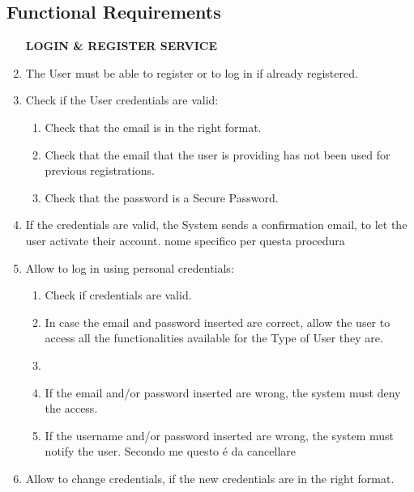\documentclass[a4paper, 10pt, oneside]{article}
\newcommand*{\lorenzo}[1]{\textcolor{BurntOrange}{#1}}
\begin{document}
\subsection{Functional Requirements}
\begin{enumerate}[align=left]
    \item[\textbf{LOGIN \& REGISTER SERVICE}]
    \item \label{req:logOrReg} The User must be able to register or to log in if already registered.
    \item \label{req:credentialsCheck} Check if the User credentials are valid:
    \begin{enumerate}[label={-}]
        \item \label{req:credentialsCheck:email} Check that the email is in the right format.
        \item \label{req:credentialsCheck:uniqueness} Check that the email that the user is providing has not been used for previous registrations.
        \item \label{req:credentialsCheck:password}Check that the password is a Secure Password.
    \end{enumerate}
    \item \label{req:confirmRegistration}If the credentials are valid, the System sends a confirmation email, to let the user activate their account. \lorenzo{nome specifico per questa procedura}
    \item \label{req:login} Allow to log in using personal credentials:
    \begin{enumerate}[label={-}]
        \item \label{req:login:checkCred}Check if credentials are valid.
        \item \label{req:login:validCred} In case the email and password inserted are correct, allow the user to access all the functionalities available for the Type of User they are.
        \item \item \label{req:login:invalidCred} If the email and/or password inserted are wrong, the system must deny the access.
        \item If the username and/or password inserted are wrong, the system must notify the user. \lorenzo{Secondo me questo é da cancellare}
    \end{enumerate}
    \item \label{req:changeCredentials} Allow to change credentials, if the new credentials are in the right format.

\end{enumerate}
\end{document}

